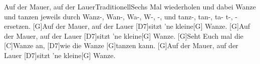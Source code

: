 \documentclass[../main.tex]{subfiles}
\begin{document}
\begin{songwithoutpagebreak}{Auf der Mauer, auf der Lauer}{Traditionell}{Sechs Mal wiederholen und dabei Wanze und tanzen jeweils durch Wanz-, Wan-, Wa-, W-, -, und tanz-, tan-, ta- t-, -  ersetzen.}
[G]Auf der Mauer, auf der Lauer [D7]sitzt 'ne kleine[G] Wanze.
[G]Auf der Mauer, auf der Lauer [D7]sitzt 'ne kleine[G] Wanze.
[G]Seht Euch mal die [C]Wanze an, [D7]wie die Wanze [G]tanzen kann.
[G]Auf der Mauer, auf der Lauer [D7]sitzt 'ne kleine[G] Wanze.
\end{songwithoutpagebreak}
\end{document}

